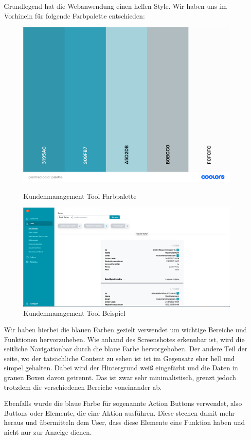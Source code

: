 Grundlegend hat die Webanwendung einen hellen Style. Wir haben uns im Vorhinein für folgende Farbpalette entschieden:

\begin{figure}[h!]
    \centering
    \includegraphics[width=1\textwidth]{pics/planfred-color-palette.png}
    \caption{Kundenmanagement Tool Farbpalette}
    \cite{frontend_design_colors}
    \label{fig:mesh1}
\end{figure}

\begin{figure}[h!]
    \centering
    \includegraphics[width=1\textwidth]{pics/planfred-ui-ux-example.png}
    \caption{Kundenmanagement Tool Beispiel}
    \label{fig:mesh1}
\end{figure}

Wir haben hierbei die blauen Farben gezielt verwendet um wichtige Bereiche und Funktionen hervorzuheben. Wie anhand des Screenshotes erkennbar ist, wird die seitliche Navigationbar durch die blaue Farbe hervorgehoben. Der andere Teil der seite, wo der tatsächliche Content zu sehen ist ist im Gegensatz eher hell und simpel gehalten. Dabei wird der Hintergrund weiß eingefärbt und die Daten in grauen Boxen davon getrennt. Das ist zwar sehr minimalistisch, grenzt jedoch trotzdem die verschiedenen Bereiche voneinander ab.

Ebenfalls wurde die blaue Farbe für sogenannte Action Buttons verwendet, also Buttons oder Elemente, die eine Aktion ausführen. Diese stechen damit mehr heraus und übermitteln dem User, dass diese Elemente eine Funktion haben und nicht nur zur Anzeige dienen.

